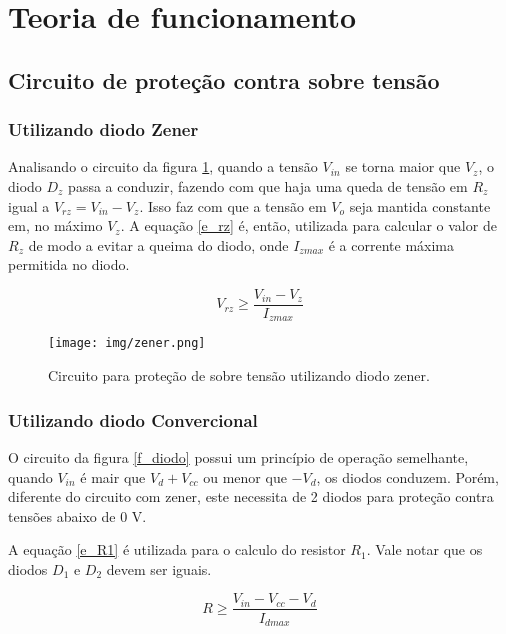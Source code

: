 \newpage
\section{Teoria de funcionamento}

\subsection{Circuito de proteção contra sobre tensão}

\subsubsection{Utilizando diodo Zener}

Analisando o circuito da figura \ref{f_zener}, quando a tensão $V_{in}$ se torna maior que $V_z$, o diodo $D_z$ passa a conduzir, fazendo com que haja uma queda de tensão em $R_z$ igual a $V_{rz} = V_{in} - V_z$. Isso faz com que a tensão em $V_o$ seja mantida constante em, no máximo $V_z$. A equação \ref{e_rz} é, então, utilizada para calcular o valor de $R_z$ de modo a evitar a queima do diodo, onde $I_{zmax}$ é a corrente máxima permitida no diodo.

\begin{equation}
V_{rz} \ge \frac{V_{in} - V_z}{I_{zmax}}
\label{e_rz}
\end{equation}

\begin{figure}[H]
    \centering
    \texttt{[image: img/zener.png]}
    \caption{Circuito para proteção de sobre tensão utilizando diodo zener.}
    \label{f_zener}
\end{figure}

\subsubsection{Utilizando diodo Convercional}
 O circuito da figura \ref{f_diodo} possui um princípio de operação semelhante, quando $V_{in}$ é mair que $V_d + V_{cc}$ ou menor que $-V_d$, os diodos conduzem. Porém, diferente do circuito com zener, este necessita de 2 diodos para proteção contra tensões abaixo de 0 V.
 
 A equação \ref{e_R1} é utilizada para o calculo do resistor $R_1$. Vale notar que os diodos $D_1$ e $D_2$ devem ser iguais.
 
 \begin{equation}
 R \ge \frac{V_{in} - V_{cc} - V_d}{I_{dmax}}
 \label{e_R1}
 \end{equation}
 
